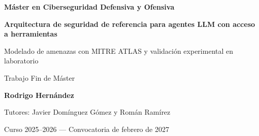 \documentclass[11pt,a4paper]{article}
\newcommand{\atlas}[1]{\textsc{#1}}
\begin{document}
\begin{titlepage}
\centering
\vspace*{2cm}
{\Large\bfseries Máster en Ciberseguridad Defensiva y Ofensiva\par}
\vspace{0.3cm}{\large Universidad Complutense de Madrid --- NTIC Master\par}
\vfill
{\LARGE\bfseries Arquitectura de seguridad de referencia para agentes LLM con acceso a herramientas\par}
\vspace{0.4cm}
{\large Modelado de amenazas con MITRE ATLAS y validación experimental en laboratorio\par}
\vfill
{\large Trabajo Fin de Máster\par}
\vspace{0.4cm}
{\large\bfseries Rodrigo Hernández\par}
\vspace{0.2cm}
{Tutores: Javier Domínguez Gómez y Román Ramírez\par}
\vspace{1cm}
{Curso 2025--2026 --- Convocatoria de febrero de 2027\par}
\end{titlepage}

\begin{abstract}
\noindent Los agentes basados en grandes modelos de lenguaje (LLM) con acceso a herramientas amplían la
superficie de ataque clásica del \emph{prompt injection} hacia la ejecución de acciones: consulta de datos,
navegación web, envío de correo y uso de credenciales. Este trabajo propone una \textbf{arquitectura de
seguridad de referencia} para este tipo de agentes, construida a partir de un modelado de amenazas
(PASTA + STRIDE) mapeado a \atlas{MITRE ATLAS} y al \emph{OWASP Top 10 for Agentic Applications 2026}, y la
\textbf{valida experimentalmente} en un laboratorio local y de coste cero. Se somete a un agente objetivo a
cuatro escenarios de ataque bajo tres configuraciones de control y se mide la tasa de éxito de ataque (ASR)
mediante detección determinista por canarios, junto con las tareas legítimas bloqueadas y completadas y la
latencia.
Los resultados, replicados con un segundo modelo, cuantifican la reducción de riesgo aportada por cada control y se sintetizan en un plano de
gobierno alineado con el marco regulatorio aplicable.

\vspace{0.3cm}
\noindent\textbf{Palabras clave:} seguridad de IA, agentes LLM, prompt injection, MITRE ATLAS, OWASP ASI,
modelado de amenazas, red teaming.
\end{abstract}
\end{document}
